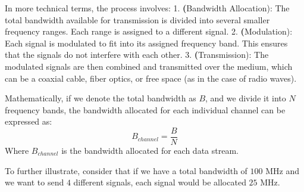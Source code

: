 In more technical terms, the process involves:
1. \textbf(Bandwidth Allocation): The total bandwidth available for transmission is divided into several smaller frequency ranges. Each range is assigned to a different signal.
2. \textbf(Modulation): Each signal is modulated to fit into its assigned frequency band. This ensures that the signals do not interfere with each other.
3. \textbf(Transmission): The modulated signals are then combined and transmitted over the medium, which can be a coaxial cable, fiber optics, or free space (as in the case of radio waves).

Mathematically, if we denote the total bandwidth as \( B \), and we divide it into \( N \) frequency bands, the bandwidth allocated for each individual channel can be expressed as:
\[
B_{channel} = \frac{B}{N}
\]
Where \( B_{channel} \) is the bandwidth allocated for each data stream.

To further illustrate, consider that if we have a total bandwidth of \( 100 \) MHz and we want to send \( 4 \) different signals, each signal would be allocated \( 25 \) MHz.


